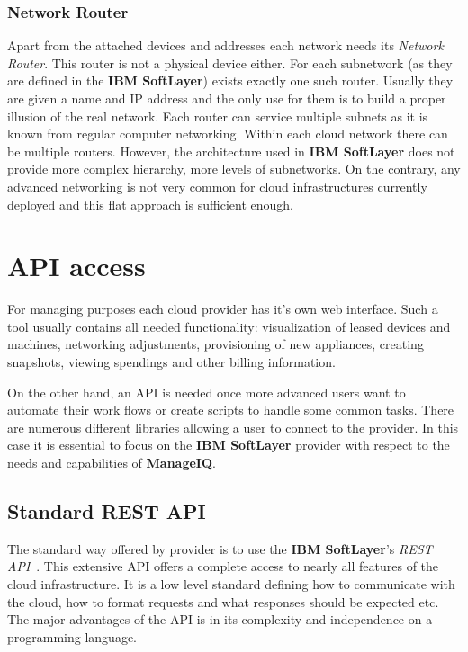 \subsubsection{Network Router}
\label{subs:Network Router}

Apart from the attached devices and addresses each network needs its \emph{Network Router}. This router is not a physical device either. For each subnetwork (as they are defined in the \textbf{IBM SoftLayer}) exists exactly one such router. Usually they are given a name and IP address and the only use for them is to build a proper illusion of the real network. Each router can service multiple subnets as it is known from regular computer networking. Within each cloud network there can be multiple routers. However, the architecture used in \textbf{IBM SoftLayer} does not provide more complex hierarchy, more levels of subnetworks. On the contrary, any advanced networking is not very common for cloud infrastructures currently deployed and this flat approach is sufficient enough.

\section{API access}
\label{sec:API access}

For managing purposes each cloud provider has it's own web interface. Such a tool usually contains all needed functionality: visualization of leased devices and machines, networking adjustments, provisioning of new appliances, creating snapshots, viewing spendings and other billing information.

On the other hand, an API is needed once more advanced users want to automate their work flows or create scripts to handle some common tasks. There are numerous different libraries allowing a user to connect to the provider. In this case it is essential to focus on the \textbf{IBM SoftLayer} provider with respect to the needs and capabilities of \textbf{ManageIQ}.

\subsection{Standard REST API}
\label{sub:Standard REST API}

The standard way offered by provider is to use the \textbf{IBM SoftLayer}'s \emph{REST API}~\cite{restapi}. This extensive API offers a complete access to nearly all features of the cloud infrastructure. It is a low level standard defining how to communicate with the cloud, how to format requests and what responses should be expected etc. The major advantages of the API is in its complexity and independence on a programming language.

